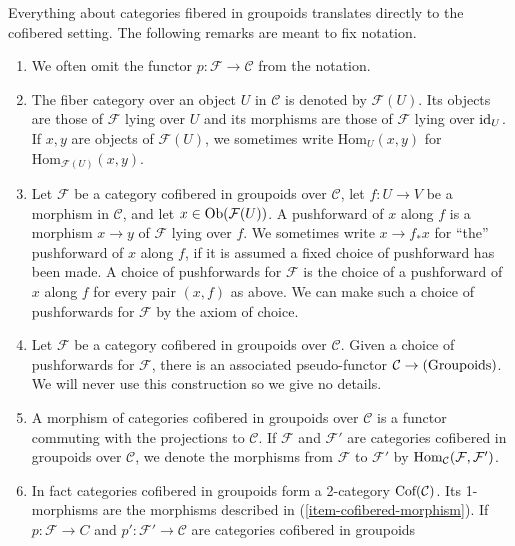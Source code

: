 \begin{remarks}
\label{remarks-cofibered-groupoids}
Everything about categories fibered in groupoids translates directly to the 
cofibered setting.  The following remarks are meant to fix notation.
\begin{enumerate}
\item We often omit the functor $p: \mathcal F \rightarrow \mathcal C$ from the 
notation.
\item The fiber category over an object $U$ in $\mathcal C$ is denoted by 
$\mathcal F(U)$. Its objects are those of $\mathcal F$ lying over $U$ and its 
morphisms are those of $\mathcal F$ lying over $\textnormal{id}_{U}$.  If $x,y$ 
are objects of $\mathcal F(U)$, we sometimes write $\text{Hom}_{U}(x,y)$ for 
$\text{Hom}_{\mathcal F(U)}(x,y)$.
\item Let $\mathcal F$ be a category cofibered in groupoids over $\mathcal C$, 
let $f: U \rightarrow V$ be a morphism in $\mathcal C$, and let $x \in 
\textnormal{Ob}(\mathcal F(U))$.  A pushforward of $x$ along $f$ is a morphism 
$x \rightarrow y$ of $\mathcal F$ lying over $f$.  We sometimes write $x 
\rightarrow f_*x$ for ``the'' pushforward of $x$ along $f$, if it is assumed a 
fixed choice of pushforward has been made.  A choice of pushforwards for 
$\mathcal F$ is the choice of a pushforward of $x$ along $f$ for every pair 
$(x,f)$ as above.  We can make such a choice of pushforwards for $\mathcal F$ 
by the axiom of choice.
\item Let $\mathcal F$ be a category cofibered in groupoids over $\mathcal C$. 
Given a choice of pushforwards for $\mathcal F$, there is an associated 
pseudo-functor $\mathcal C \rightarrow \textnormal{(Groupoids)}$.  We will 
never use this construction so we give no details.
\item
\label{item-cofibered-morphism}
A morphism of categories cofibered in groupoids over $\mathcal C$ is a functor 
commuting with the projections to $\mathcal C$.  If $\mathcal F$ and $\mathcal 
F'$ are categories cofibered in groupoids over $\mathcal C$, we denote the 
morphisms from $\mathcal F$ to $\mathcal F'$ by $\textnormal{Hom}_{\mathcal 
C}(\mathcal F, \mathcal F')$.
\item 
\label{item-definition-cofibered-groupoids-2-category}
In fact categories cofibered in groupoids form a 2-category 
$\textnormal{Cof}(\mathcal C)$. Its 1-morphisms are the morphisms described in 
(\ref{item-cofibered-morphism}).  If $p: \mathcal F \rightarrow C$ and 
$p': \mathcal F' \rightarrow \mathcal C$ are categories cofibered in groupoids 

\end{enumerate}
\end{remarks}
